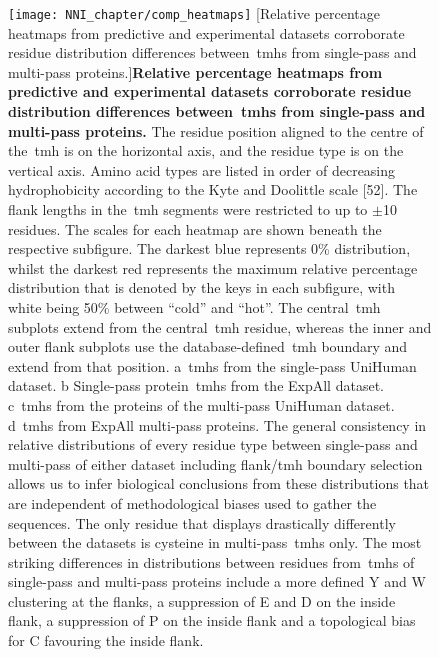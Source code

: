 \begin{figure}[p]
\centering
\texttt{[image: NNI\_chapter/comp\_heatmaps]}
[Relative percentage heatmaps from predictive and experimental datasets corroborate residue distribution differences between~\gls{tmh}s from single-pass and multi-pass proteins.]{\textbf{Relative percentage heatmaps from predictive and experimental datasets corroborate residue distribution differences between~\gls{tmh}s from single-pass and multi-pass proteins.}
The residue position aligned to the centre of the~\gls{tmh} is on the horizontal axis, and the residue type is on the vertical axis.
Amino acid types are listed in order of decreasing hydrophobicity according to the Kyte and Doolittle scale [52].
The flank lengths in the~\gls{tmh} segments were restricted to up to $\pm$10 residues.
The scales for each heatmap are shown beneath the respective subfigure.
The darkest blue represents 0\% distribution, whilst the darkest red represents the maximum relative percentage distribution that is denoted by the keys in each subfigure, with white being 50\% between ``cold'' and ``hot''.
The central~\gls{tmh} subplots extend from the central~\gls{tmh} residue, whereas the inner and outer flank subplots use the database-defined~\gls{tmh} boundary and extend from that position.
a~\gls{tmh}s from the single-pass UniHuman dataset.
b Single-pass protein~\gls{tmh}s from the ExpAll dataset.
c~\gls{tmh}s from the proteins of the multi-pass UniHuman dataset.
d~\gls{tmh}s from ExpAll multi-pass proteins.
The general consistency in relative distributions of every residue type between single-pass and multi-pass of either dataset including flank/\gls{tmh} boundary selection allows us to infer biological conclusions from these distributions that are independent of methodological biases used to gather the sequences.
The only residue that displays drastically differently between the datasets is cysteine in multi-pass~\gls{tmh}s only.
The most striking differences in distributions between residues from~\gls{tmh}s of single-pass and multi-pass proteins include a more defined Y and W clustering at the flanks, a suppression of E and D on the inside flank, a suppression of P on the inside flank and a topological bias for C favouring the inside flank.}

\label{fig:comp_heatmaps}
\end{figure}

